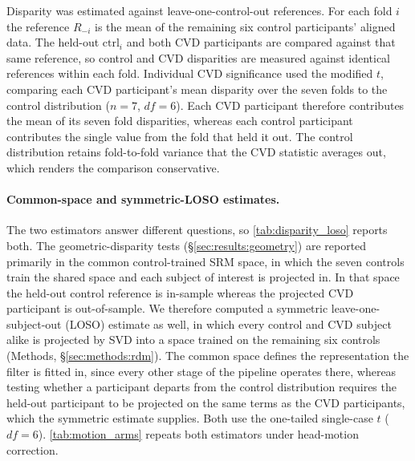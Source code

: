 

Disparity was estimated against leave-one-control-out references. For each fold $i$ the reference $R_{-i}$ is the mean of the remaining six control participants' aligned data. The held-out $\text{ctrl}_i$ and both CVD participants are compared against that same reference, so control and CVD disparities are measured against identical references within each fold. Individual CVD significance used the \textcite{crawford1998} modified $t$, comparing each CVD participant's mean disparity over the seven folds to the control distribution ($n = 7$, $df = 6$). Each CVD participant therefore contributes the mean of its seven fold disparities, whereas each control participant contributes the single value from the fold that held it out. The control distribution retains fold-to-fold variance that the CVD statistic averages out, which renders the comparison conservative.

\paragraph{Common-space and symmetric-LOSO estimates.}
The two estimators answer different questions, so \cref{tab:disparity_loso} reports both. The geometric-disparity tests (\S\ref{sec:results:geometry}) are reported primarily in the common control-trained SRM space, in which the seven controls train the shared space and each subject of interest is projected in. In that space the held-out control reference is in-sample whereas the projected CVD participant is out-of-sample. We therefore computed a symmetric leave-one-subject-out (LOSO) estimate as well, in which every control and CVD subject alike is projected by SVD into a space trained on the remaining six controls (Methods, \S\ref{sec:methods:rdm}). The common space defines the representation the filter is fitted in, since every other stage of the pipeline operates there, whereas testing whether a participant departs from the control distribution requires the held-out participant to be projected on the same terms as the CVD participants, which the symmetric estimate supplies. Both use the \textcite{crawford1998} one-tailed single-case $t$ ($df = 6$). \cref{tab:motion_arms} repeats both estimators under head-motion correction.

